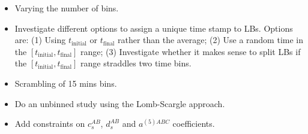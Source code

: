 \begin{itemize}
    \item Varying the number of bins.
    \item Investigate different options to assign a unique time stamp to LBs. Options are: (1) Using $t_\text{initial}$ or $t_\text{final}$ rather than the average; (2) Use a random time in the $[t_\text{initial},t_\text{final}]$ range; (3) Investigate whether it makes sense to split LBs if the $[t_\text{initial},t_\text{final}]$ range straddles two time bins.
    \item Scrambling of 15 mins bins.
    \item Do an unbinned study using the Lomb-Scargle approach.
    \item Add constraints on $c_s^{AB}$, $d_s^{AB}$ and $a^{(5)ABC}$ coefficients.
\end{itemize}